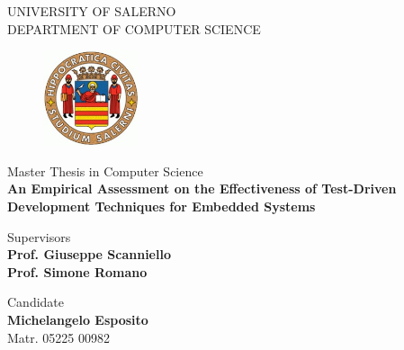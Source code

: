 \renewcommand{\baselinestretch}{1.5}  
\begin{titlepage}  
    \begin{center}
        \LARGE{\uppercase{University of Salerno}}\\
        \vspace{5mm}
    	\uppercase{\normalsize Department of Computer Science}\\
    \end{center}

    \begin{figure}
        \centering
        \includegraphics[width=0.25\textwidth]{figures/logo_standard.jpg}
    \end{figure}
    
    \begin{center}
    	\large{ Master Thesis in Computer Science }\\
    	\vspace{5mm}
        {\LARGE{\textbf{An Empirical Assessment on the Effectiveness of Test-Driven Development Techniques for Embedded Systems}}}
    	\vspace{3mm}
    \end{center}
    
    \vspace{10mm}
    \noindent
    \begin{minipage}[t]{0.60\textwidth}
    	{\large{Supervisors}}
    	\\
    	{\large{\textbf{Prof. Giuseppe Scanniello}}}
        \\
        {\large{ \textbf{Prof. Simone Romano}}}
    \end{minipage}
    \hfill
    \begin{minipage}[t]{0.4\textwidth}\raggedleft
    
    	{\large{Candidate \\ \textbf{Michelangelo Esposito}\\ Matr. 05225 00982}}
    \end{minipage}
    
    \vspace{25mm}
    

\end{titlepage}

\renewcommand{\baselinestretch}{1} 